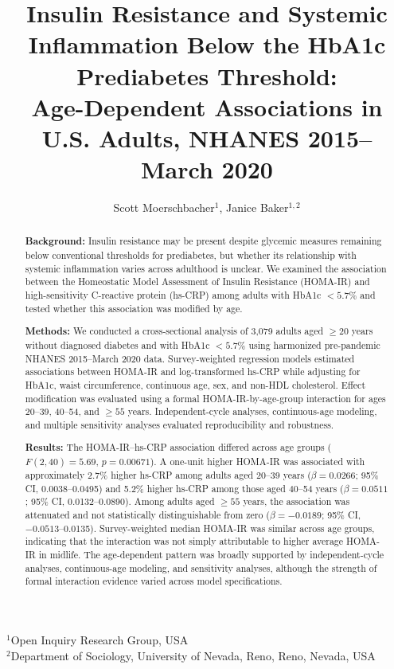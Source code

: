 \documentclass[11pt]{article}
\title{\textbf{Insulin Resistance and Systemic Inflammation Below the HbA1c Prediabetes Threshold:}\\
\textbf{Age-Dependent Associations in U.S. Adults, NHANES 2015--March 2020}}
\begin{document}
\author{
Scott Moerschbacher$^{1}$,
Janice Baker$^{1,2}$
}

\date{}
\maketitle

\begin{center}
$^{1}$Open Inquiry Research Group, USA\\
$^{2}$Department of Sociology, University of Nevada, Reno,
Reno, Nevada, USA
\end{center}

\vspace{1em}

\begin{abstract}

\textbf{Background:}
Insulin resistance may be present despite glycemic measures remaining below
conventional thresholds for prediabetes, but whether its relationship with
systemic inflammation varies across adulthood is unclear. We examined the
association between the Homeostatic Model Assessment of Insulin Resistance
(HOMA-IR) and high-sensitivity C-reactive protein (hs-CRP) among adults with
HbA1c $<5.7\%$ and tested whether this association was modified by age.

\textbf{Methods:}
We conducted a cross-sectional analysis of 3,079 adults aged $\geq20$ years
without diagnosed diabetes and with HbA1c $<5.7\%$ using harmonized
pre-pandemic NHANES 2015--March 2020 data. Survey-weighted regression models
estimated associations between HOMA-IR and log-transformed hs-CRP while
adjusting for HbA1c, waist circumference, continuous age, sex, and non-HDL
cholesterol. Effect modification was evaluated using a formal
HOMA-IR-by-age-group interaction for ages 20--39, 40--54, and $\geq55$
years. Independent-cycle analyses, continuous-age modeling, and multiple
sensitivity analyses evaluated reproducibility and robustness.

\textbf{Results:}
The HOMA-IR--hs-CRP association differed across age groups
($F(2,40)=5.69$, $p=0.00671$). A one-unit higher HOMA-IR was associated
with approximately 2.7\% higher hs-CRP among adults aged 20--39 years
($\beta=0.0266$; 95\% CI, 0.0038--0.0495) and 5.2\% higher hs-CRP among
those aged 40--54 years ($\beta=0.0511$; 95\% CI, 0.0132--0.0890).
Among adults aged $\geq55$ years, the association was attenuated and not
statistically distinguishable from zero ($\beta=-0.0189$; 95\% CI,
$-0.0513$--0.0135). Survey-weighted median HOMA-IR was similar across age
groups, indicating that the interaction was not simply attributable to
higher average HOMA-IR in midlife. The age-dependent pattern was broadly
supported by independent-cycle analyses, continuous-age modeling, and
sensitivity analyses, although the strength of formal interaction evidence
varied across model specifications.


\end{abstract}
\end{document}
